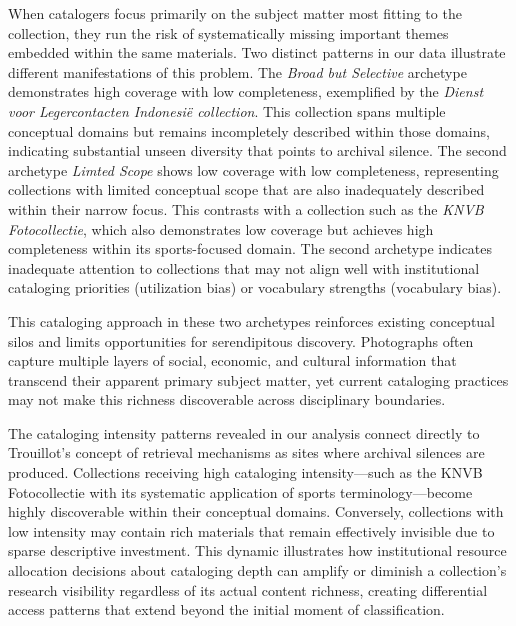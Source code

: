 \documentclass[final]{anthology-ch}
\begin{document}
When catalogers focus primarily on the subject matter most fitting to the collection, they run the risk of systematically missing important themes embedded within the same materials. Two distinct patterns in our data illustrate different manifestations of this problem. The \textit{Broad but Selective} archetype demonstrates high coverage with low completeness, exemplified by the \textit{Dienst voor Legercontacten Indonesi\"{e} collection}. This collection spans multiple conceptual domains but remains incompletely described within those domains, indicating substantial unseen diversity that points to archival silence. The second archetype \textit{Limted Scope} shows low coverage with low completeness, representing collections with limited conceptual scope that are also inadequately described within their narrow focus. This contrasts with a collection such as the \textit{KNVB Fotocollectie}, which also demonstrates low coverage but achieves high completeness within its sports-focused domain. The second archetype indicates inadequate attention to collections that may not align well with institutional cataloging priorities (utilization bias) or vocabulary strengths (vocabulary bias). 

This cataloging approach in these two archetypes reinforces existing conceptual silos and limits opportunities for serendipitous discovery. Photographs often capture multiple layers of social, economic, and cultural information that transcend their apparent primary subject matter, yet current cataloging practices may not make this richness discoverable across disciplinary boundaries.

The cataloging intensity patterns revealed in our analysis connect directly to Trouillot's concept of retrieval mechanisms as sites where archival silences are produced. Collections receiving high cataloging intensity—such as the KNVB Fotocollectie with its systematic application of sports terminology—become highly discoverable within their conceptual domains. Conversely, collections with low intensity may contain rich materials that remain effectively invisible due to sparse descriptive investment. This dynamic illustrates how institutional resource allocation decisions about cataloging depth can amplify or diminish a collection's research visibility regardless of its actual content richness, creating differential access patterns that extend beyond the initial moment of classification.
\end{document}
